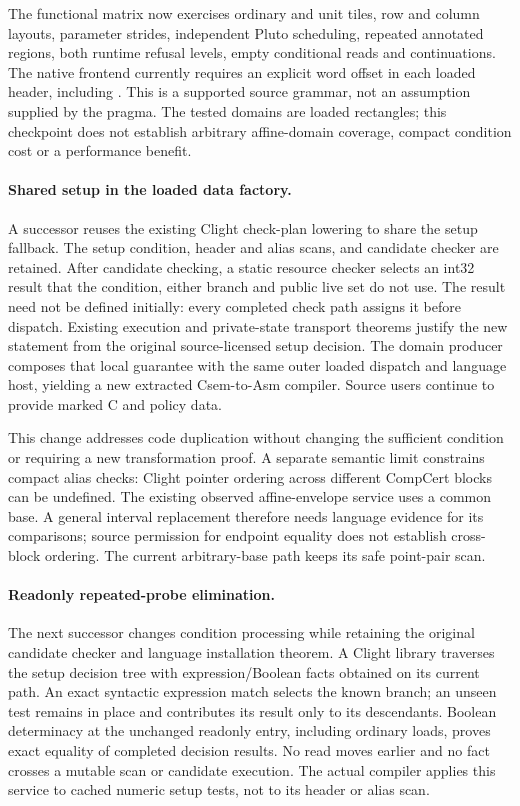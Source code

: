 The functional matrix now exercises ordinary and unit tiles, row and column
layouts, parameter strides, independent Pluto scheduling, repeated annotated
regions, both runtime refusal levels, empty conditional reads and continuations.
The native frontend currently requires an explicit word offset in each loaded
header, including . This is a supported source grammar, not an
assumption supplied by the pragma. The tested domains are loaded rectangles;
this checkpoint does not establish arbitrary affine-domain coverage, compact
condition cost or a performance benefit.

\paragraph{Shared setup in the loaded data factory.}
A successor reuses the existing Clight check-plan lowering to share the setup
fallback. The setup condition, header and alias scans, and candidate checker
are retained. After candidate checking, a static resource checker selects an
int32 result that the condition, either branch and public live set do not use.
The result need not be defined initially: every completed check path assigns
it before dispatch. Existing execution and private-state transport theorems
justify the new statement from the original source-licensed setup decision.
The domain producer composes that local guarantee with the same outer loaded
dispatch and language host, yielding a new extracted Csem-to-Asm compiler.
Source users continue to provide marked C and policy data.

This change addresses code duplication without changing the sufficient
condition or requiring a new transformation proof. A separate semantic limit
constrains compact alias checks: Clight pointer ordering across different
CompCert blocks can be undefined. The existing observed affine-envelope
service uses a common base. A general interval replacement therefore needs
language evidence for its comparisons; source permission for endpoint
equality does not establish cross-block ordering. The current arbitrary-base
path keeps its safe point-pair scan.

\paragraph{Readonly repeated-probe elimination.}
The next successor changes condition processing while retaining the original
candidate checker and language installation theorem. A Clight library traverses
the setup decision tree with expression/Boolean facts obtained on its current
path. An exact syntactic expression match selects the known branch; an unseen
test remains in place and contributes its result only to its descendants.
Boolean determinacy at the unchanged readonly entry, including ordinary loads,
proves exact equality of completed decision results. No read moves earlier and
no fact crosses a mutable scan or candidate execution. The actual compiler
applies this service to cached numeric setup tests, not to its header or alias
scan.

